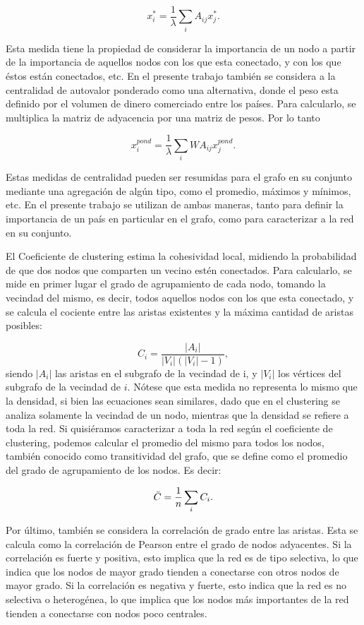 \documentclass[class=article, crop=false]{standalone}
\begin{document}
$$
x_i^*=\frac{1}{\lambda}  \sum_{i} A_{ij}x_{j}^*.
$$

Esta medida tiene la propiedad de considerar la importancia de un nodo a partir de la importancia de aquellos nodos con los que esta conectado, y con los que éstos están conectados, etc. En el presente trabajo también se considera a la centralidad de autovalor ponderado como una alternativa, donde el peso esta definido por el volumen de dinero comerciado entre los países. Para calcularlo, se multiplica la matriz de adyacencia por una matriz de pesos. Por lo tanto

$$
x_i^{pond}=\frac{1}{\lambda}  \sum_{i} WA_{ij}x_{j}^{pond}.
$$

Estas medidas de centralidad pueden ser resumidas para el grafo en su conjunto mediante una agregación de algún tipo, como el promedio, máximos y mínimos, etc. En el presente trabajo se utilizan de ambas maneras, tanto para definir la importancia de un país en particular en el grafo, como para caracterizar a la red en su conjunto.
\par

El Coeficiente de clustering estima la cohesividad local, midiendo la probabilidad de que dos nodos que comparten un vecino estén conectados. Para calcularlo, se mide en primer lugar el grado de agrupamiento de cada nodo, tomando la vecindad del mismo, es decir, todos aquellos nodos con los que esta conectado, y se calcula el cociente entre las aristas existentes y la máxima cantidad de aristas posibles:

$$
C_i = \frac{|A_i|}{|V_i|(|V_i|-1)},
$$
siendo $|A_i|$ las aristas en el subgrafo de la vecindad de i, y $|V_i|$ los vértices del subgrafo de la vecindad de $i$. Nótese que esta medida no representa lo mismo que la densidad, si bien las ecuaciones sean similares, dado que en el clustering se analiza solamente la vecindad de un nodo, mientras que la densidad se refiere a toda la red.
Si quisiéramos caracterizar a toda la red según el coeficiente de clustering, podemos calcular el promedio del mismo para todos los nodos, también conocido como transitividad del grafo, que se define como el promedio del grado de agrupamiento de los nodos. Es decir:

$$
\Bar{C} = \frac{1}{n} \sum_{i} C_{i}.
$$ 


Por último, también se considera la correlación de grado entre las aristas. Esta se calcula como la correlación de Pearson entre el grado de nodos adyacentes. Si la correlación es fuerte y positiva, esto implica que la red es de tipo selectiva, lo que indica que los nodos de mayor grado tienden a conectarse con otros nodos de mayor grado. Si la correlación es negativa y fuerte, esto indica que la red es no selectiva o heterogénea, lo que implica que los nodos más importantes de la red tienden a conectarse con nodos poco centrales. 
\end{document}

